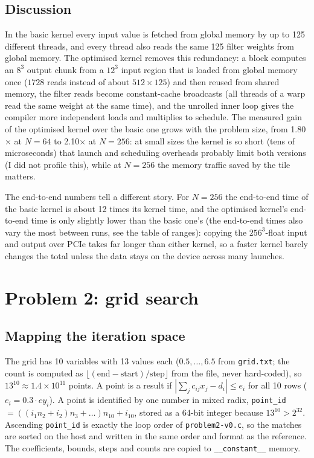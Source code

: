 \documentclass[11pt]{article}
\begin{document}
\subsection*{Discussion}
In the basic kernel every input value is fetched from global memory by up to
125 different threads, and every thread also reads the same 125 filter weights
from global memory. The optimised kernel removes this redundancy: a block
computes an $8^3$ output chunk from a $12^3$ input region that is loaded from
global memory once ($1728$ reads instead of about $512\times125$) and then
reused from shared memory, the filter reads become constant-cache broadcasts
(all threads of a warp read the same weight at the same time), and the
unrolled inner loop gives the compiler more independent loads and multiplies
to schedule. The measured gain of the optimised kernel over the basic one
grows with the problem size, from 1.80$\times$ at $N=64$ to
2.10$\times$ at $N=256$: at small sizes the kernel is so short
(tens of microseconds) that launch and scheduling overheads probably limit
both versions (I did not profile this), while at $N=256$ the memory traffic
saved by the tile matters.

The end-to-end numbers tell a different story. For $N=256$ the end-to-end
time of the basic kernel is about 12 times its kernel time, and the
optimised kernel's end-to-end time is only slightly lower than the basic one's
(the end-to-end times also vary the most between runs, see the table of ranges):
copying the $256^3$-float input and output over PCIe takes far longer than
either kernel, so a faster kernel barely changes the total unless the data
stays on the device across many launches.

\section*{Problem 2: grid search}

\subsection*{Mapping the iteration space}
The grid has 10 variables with 13 values each ($0.5,\dots,6.5$ from
\texttt{grid.txt}; the count is computed as $\lfloor(\mathrm{end}-\mathrm{start})/\mathrm{step}\rfloor$ from
the file, never hard-coded), so $13^{10}\approx1.4\times10^{11}$ points. A
point is a result if $|\sum_j c_{ij}x_j-d_i|\le e_i$ for all 10 rows
($e_i=0.3\cdot ey_i$). A point is identified by one number in mixed radix,
\texttt{point\_id} $=((i_1 n_2+i_2)n_3+\dots)n_{10}+i_{10}$, stored as a 64-bit
integer because $13^{10}>2^{32}$. Ascending \texttt{point\_id} is exactly the
loop order of \texttt{problem2-v0.c}, so the matches are sorted on the host and
written in the same order and format as the reference. The coefficients,
bounds, steps and counts are copied to \texttt{\_\_constant\_\_} memory.
\end{document}
